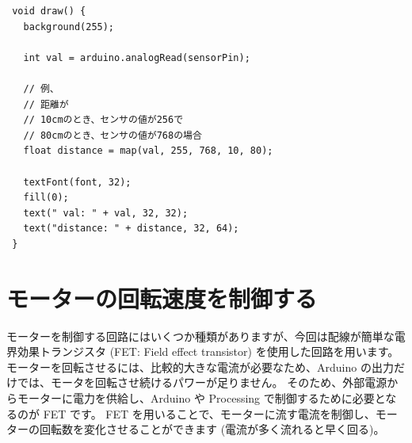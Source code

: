 \documentclass[11pt,a4paper]{jarticle}
\begin{document}
\begin{lstlisting}
 void draw() {
   background(255);

   int val = arduino.analogRead(sensorPin);

   // 例、
   // 距離が
   // 10cmのとき、センサの値が256で
   // 80cmのとき、センサの値が768の場合
   float distance = map(val, 255, 768, 10, 80);

   textFont(font, 32);
   fill(0);
   text(" val: " + val, 32, 32);
   text("distance: " + distance, 32, 64);
 }
\end{lstlisting}


\section{モーターの回転速度を制御する}
モーターを制御する回路にはいくつか種類がありますが、今回は配線が簡単な電界効果トランジスタ (FET: Field effect transistor) を使用した回路を用います。
モーターを回転させるには、比較的大きな電流が必要なため、Arduino の出力だけでは、モータを回転させ続けるパワーが足りません。
そのため、外部電源からモーターに電力を供給し、Arduino や Processing で制御するために必要となるのが FET です。
FET を用いることで、モーターに流す電流を制御し、モーターの回転数を変化させることができます (電流が多く流れると早く回る)。
\end{document}
